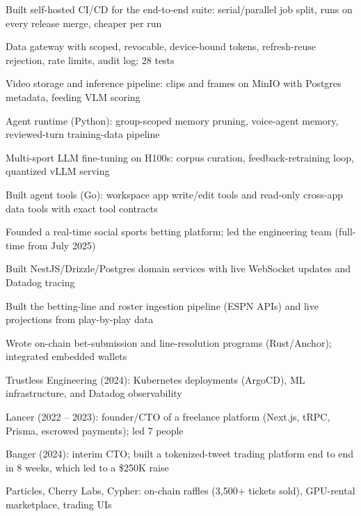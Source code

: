 \documentclass[print]{jack-resume}
\begin{document}
\begin{tightemize}
    \item Built self-hosted CI/CD for the end-to-end suite: serial/parallel job split, runs on every release merge, cheaper per run
    \item Data gateway with scoped, revocable, device-bound tokens, refresh-reuse rejection, rate limits, audit log; 28 tests
    \item Video storage and inference pipeline: clips and frames on MinIO with Postgres metadata, feeding VLM scoring
    \item Agent runtime (Python): group-scoped memory pruning, voice-agent memory, reviewed-turn training-data pipeline
    \item Multi-sport LLM fine-tuning on H100s: corpus curation, feedback-retraining loop, quantized vLLM serving
    \item Built agent tools (Go): workspace app write/edit tools and read-only cross-app data tools with exact tool contracts
\end{tightemize}
\sectionsep

\begin{tightemize}
    \item Founded a real-time social sports betting platform; led the engineering team (full-time from July 2025)
    \item Built NestJS/Drizzle/Postgres domain services with live WebSocket updates and Datadog tracing
    \item Built the betting-line and roster ingestion pipeline (ESPN APIs) and live projections from play-by-play data
    \item Wrote on-chain bet-submission and line-resolution programs (Rust/Anchor); integrated embedded wallets
\end{tightemize}
\sectionsep

\begin{tightemize}
    \item Trustless Engineering (2024): Kubernetes deployments (ArgoCD), ML infrastructure, and Datadog observability
    \item Lancer (2022 – 2023): founder/CTO of a freelance platform (Next.js, tRPC, Prisma, escrowed payments); led 7 people
    \item Banger (2024): interim CTO; built a tokenized-tweet trading platform end to end in 8 weeks, which led to a \$250K raise
    \item Particles, Cherry Labs, Cypher: on-chain raffles (3,500+ tickets sold), GPU-rental marketplace, trading UIs
\end{tightemize}
\sectionsep
\end{document}

